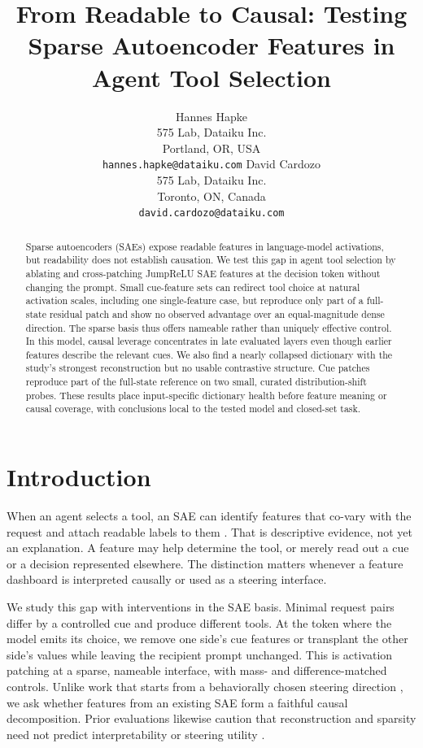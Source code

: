 \documentclass{article}
\title{From Readable to Causal: Testing Sparse Autoencoder Features in Agent Tool Selection}
\author{%
  Hannes Hapke \\
  575 Lab, Dataiku Inc.\\
  Portland, OR, USA\\
  \texttt{hannes.hapke@dataiku.com}
  \And
  David Cardozo \\
  575 Lab, Dataiku Inc.\\
  Toronto, ON, Canada\\
  \texttt{david.cardozo@dataiku.com}
}
\begin{document}
\maketitle

\begin{abstract}
Sparse autoencoders (SAEs) expose readable features in language-model
activations, but readability does not establish causation. We test this gap in
agent tool selection by ablating and cross-patching JumpReLU SAE features at
the decision token without changing the prompt. Small cue-feature sets can
redirect tool choice at natural activation scales, including one
single-feature case, but reproduce only part of a full-state residual patch
and show no observed advantage over an equal-magnitude dense direction. The sparse basis thus
offers nameable rather than uniquely effective control. In this model, causal
leverage concentrates in late evaluated layers even though earlier features
describe the relevant cues. We also find a nearly collapsed dictionary with
the study's strongest reconstruction but no usable contrastive structure.
Cue patches reproduce part of the full-state reference on two small, curated
distribution-shift probes. These results place input-specific dictionary health
before feature meaning or causal coverage, with conclusions local to the
tested model and closed-set task.
\end{abstract}

\section{Introduction}
\label{sec:intro}

When an agent selects a tool, an SAE can identify features that co-vary with
the request and attach readable labels to them
\citep{ref_bricken2023,cunningham2023sparseautoencodershighlyinterpretable}.
That is descriptive evidence, not yet an explanation. A feature may help
determine the tool, or merely read out a cue or a decision represented
elsewhere. The distinction matters whenever a feature dashboard is interpreted
causally or used as a steering interface.

We study this gap with interventions in the SAE basis. Minimal request pairs
differ by a controlled cue and produce different tools. At the token where the
model emits its choice, we remove one side's cue features or transplant the
other side's values while leaving the recipient prompt unchanged. This is
activation patching
\citep{meng2022locatingeditingfactualassociations,
wang2022interpretabilitywildcircuitindirect} at a sparse, nameable interface,
with mass- and difference-matched controls. Unlike work that starts from a
behaviorally chosen steering direction
\citep{turner2024steeringlanguagemodelsactivation,templeton2024scaling}, we ask
whether features from an existing SAE form a faithful causal decomposition.
Prior evaluations likewise caution that reconstruction and sparsity need not
predict interpretability or steering utility
\citep{gao2024scalingevaluatingsparseautoencoders,
makelov2024principledevaluationssparseautoencoders}.
\end{document}
